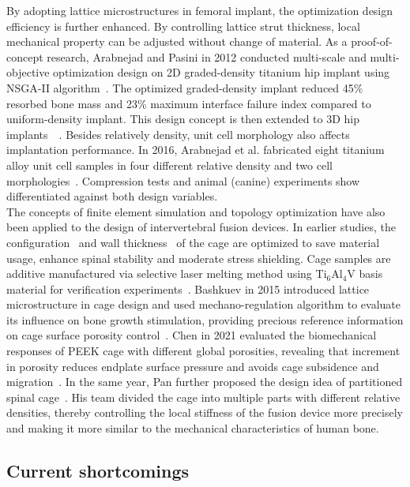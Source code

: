 \documentclass[12pt]{extbook}
\begin{document}
By adopting lattice microstructures in femoral implant, the optimization design efficiency is further enhanced. By controlling lattice strut thickness, local mechanical property can be adjusted without change of material. As a proof-of-concept research, Arabnejad and Pasini in 2012 conducted multi-scale and multi-objective optimization design on 2D graded-density titanium hip implant using NSGA-II algorithm~\cite{khanoki2012multiscale}. The optimized graded-density implant reduced 45\% resorbed bone mass and 23\% maximum interface failure index compared to uniform-density implant. This design concept is then extended to 3D hip implants~\cite{arabnejad2017fully}~\cite{wang2018hip}. Besides relatively density, unit cell morphology also affects implantation performance. In 2016, Arabnejad et al. fabricated eight titanium alloy unit cell samples in four different relative density and two cell morphologies~\cite{arabnejad2016high}. Compression tests and animal (canine) experiments show differentiated against both design variables.\\

The concepts of finite element simulation and topology optimization have also been applied to the design of intervertebral fusion devices. In earlier studies, the configuration~\cite{zhong2006finite} and wall thickness~\cite{schnitzer2020comparison} of the cage are optimized to save material usage, enhance spinal stability and moderate stress shielding. Cage samples are additive manufactured via selective laser melting method using Ti$_6$Al$_4$V basis material for verification experiments~\cite{schnitzer2020comparison}. Bashkuev in 2015 introduced lattice microstructure in cage design and used mechano-regulation algorithm to evaluate its influence on bone growth stimulation, providing precious reference information on cage surface porosity control~\cite{bashkuev2015computational}. Chen in 2021 evaluated the biomechanical responses of PEEK cage with different global porosities, revealing that increment in porosity reduces endplate surface pressure and avoids cage subsidence and migration~\cite{chen2021computational}. In the same year, Pan further proposed the design idea of partitioned spinal cage~\cite{pan2021design}. His team divided the cage into multiple parts with different relative densities, thereby controlling the local stiffness of the fusion device more precisely and making it more similar to the mechanical characteristics of human bone.\\

\subsection{Current shortcomings}
\end{document}
